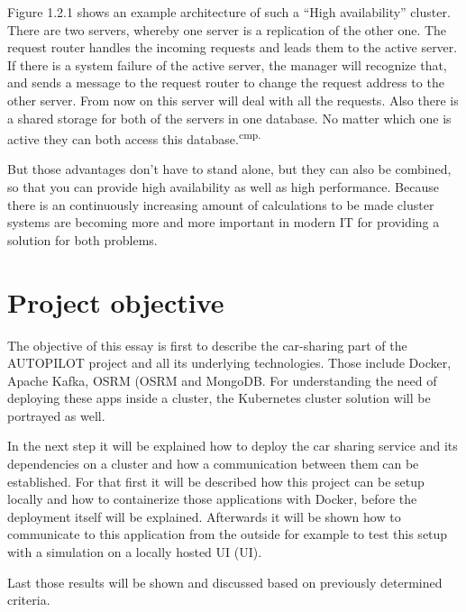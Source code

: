 Figure 1.2.1 shows an example architecture of such a ``High availability'' cluster. There are two servers, whereby one server is a replication of the other one. The request router handles the incoming requests and leads them to the active server. If there is a system failure of the active server, the manager will recognize that, and sends a message to the request router to change the request address to the other server. From now on this server will deal with all the requests. Also there is a shared storage for both of the servers in one database. No matter which one is active they can both access this database.\textsuperscript{cmp.\cite{10}}


But those advantages don't have to stand alone, but they can also be combined, so that you can provide high availability as well as high performance. Because there is an continuously increasing amount of calculations to be made cluster systems are becoming more and more important in modern IT for providing a solution for both problems.

\section{Project objective}

The objective of this essay is first to describe the car-sharing part of the AUTOPILOT project and all its underlying technologies. Those include Docker, Apache Kafka, \acs{OSRM} (\acl{OSRM} and MongoDB.  For understanding the need of deploying these apps inside a cluster, the Kubernetes cluster solution will be portrayed as well.

In the next step it will be explained how to deploy the car sharing service and its dependencies on a cluster and how a communication between them can be established. For that first it will be described how this project can be setup locally and how to containerize those applications with Docker, before the deployment itself will be explained. Afterwards it will be shown how to communicate to this application from the outside for example to test this setup with a simulation on a locally hosted \acs{UI} (\acl{UI}).

Last those results will be shown and discussed based on previously determined criteria. 


